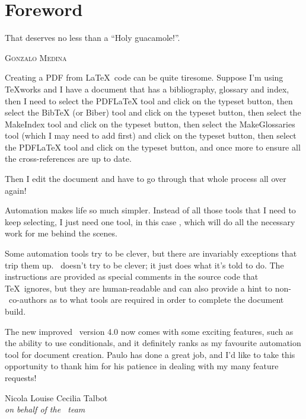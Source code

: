 \chapter*{Foreword}
\label{chap:foreword}

\epigraph{That deserves no less than a ``Holy guacamole!''.}{\textsc{Gonzalo Medina}}

Creating a PDF from \LaTeX\ code can be quite tiresome. Suppose I'm
using TeXworks and I have a document that has a bibliography,
glossary and index, then I need to select the PDFLaTeX tool and click
on the typeset button, then select the BibTeX (or Biber) tool and click
on the typeset button, then select the MakeIndex tool and click on
the typeset button, then select the MakeGlossaries tool (which I may
need to add first) and click on the typeset button, then select the
PDFLaTeX tool and click on the typeset button, and once more to
ensure all the cross-references are up to date.

Then I edit the document and have to go through that whole process
all over again!

Automation makes life so much simpler. Instead of all those tools
that I need to keep selecting, I just need one tool, in this case
\arara, which will do all the necessary work for me behind the
scenes.

Some automation tools try to be clever, but there are invariably
exceptions that trip them up. \arara\ doesn't try to be clever; it 
just does what it's told to do. The instructions are provided as
special comments in the source code that \TeX\ ignores, but they are
human-readable and can also provide a hint to non-\arara\ co-authors
as to what tools are required in order to complete the document
build.

The new improved \arara\ version 4.0 now comes with some exciting
features, such as the ability to use conditionals, and it definitely
ranks as my favourite automation tool for document creation. Paulo
has done a great job, and I'd like to take this opportunity to thank
him for his patience in dealing with my many feature requests!

\vfill

\begin{flushright}
Nicola Louise Cecilia Talbot\\
\emph{on behalf of the \arara\ team}
\end{flushright}
